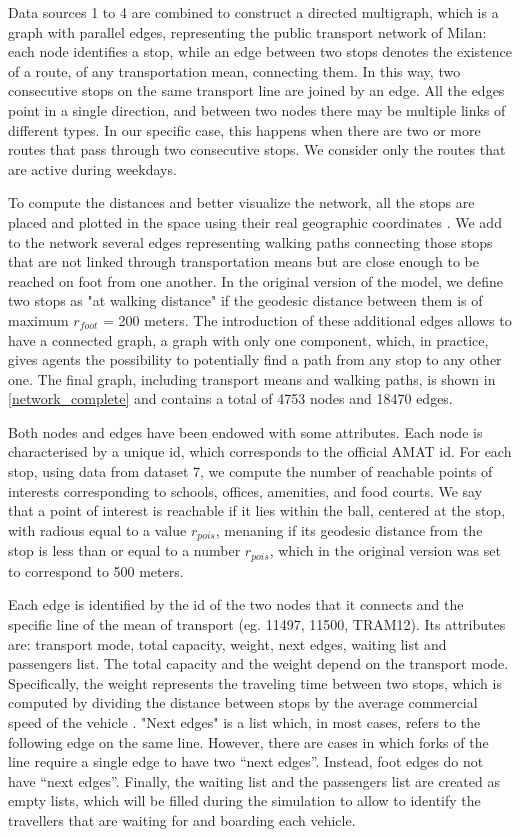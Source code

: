 Data sources 1 to 4 are combined to construct a directed multigraph, which is a graph with parallel edges, representing the public transport network of Milan: each node identifies a stop, while an edge between two stops denotes the existence of a route, of any transportation mean, connecting them. In this way, two consecutive stops on the same transport line are joined by an edge. All the edges point in a single direction, and between two nodes there may be multiple links of different types. In our specific case, this happens when there are two or more routes that pass through two consecutive stops. We consider only the routes that are active during weekdays.

To compute the distances and better visualize the network, all the stops are placed and plotted in the space using their real geographic coordinates \cite{site2,site6}.  
We add to the network several edges representing walking paths connecting those stops that are not linked through transportation means but are close enough to be reached on foot from one another. In the original version of the model, we define two stops as "at walking distance" if the geodesic distance between them is of maximum $r_{foot}$ = 200 meters. The introduction of these additional edges allows to have a connected graph, a graph with only one component, which, in practice, gives agents the possibility to potentially find a path from any stop to any other one.
The final graph, including transport means and walking paths, is shown in \ref{network_complete} and contains a total of 4753 nodes and 18470 edges. 

Both nodes and edges have been endowed with some attributes.
Each node is characterised by a unique id, which corresponds to the official AMAT id. For each stop, using data from dataset 7, we compute the number of reachable points of interests corresponding to schools, offices, amenities, and food courts. We say that a point of interest is reachable if it lies within the ball, centered at the stop, with radious equal to a value $r_{pois}$, menaning if its geodesic distance from the stop is less than or equal to a number $r_{pois}$, which in the original version was set to correspond to 500 meters.  
 
Each edge is identified by the id of the two nodes that it connects and the specific line of the mean of transport (eg. 11497, 11500, TRAM12). Its attributes are: transport mode, total capacity, weight, next edges, waiting list and passengers list. The total capacity \cite{site13,site14,site15,site16} and the weight depend on the transport mode. Specifically, the weight represents the traveling time between two stops, which is computed by dividing the distance between stops by the average commercial speed of the vehicle \cite{site17}. "Next edges" is a list which, in most cases, refers to the following edge on the same line. However, there are cases in which forks of the line require a single edge to have two “next edges”. Instead, foot edges do not have “next edges”. Finally, the waiting list and the passengers list are created as empty lists, which will be filled during the simulation to allow to identify the travellers that are waiting for and boarding each vehicle. 

